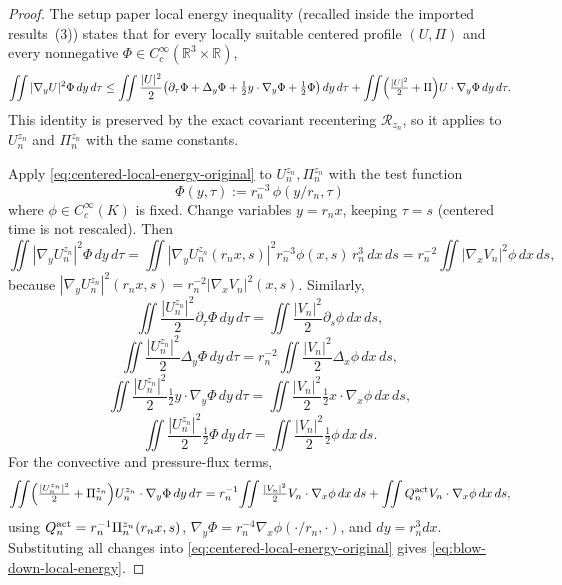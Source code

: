 \documentclass[11pt]{amsart}
\numberwithin{equation}{section}
\theoremstyle{plain}
\theoremstyle{definition}
\theoremstyle{remark}
\newcommand{\calR}{\mathcal R}
\begin{document}
\begin{proof}
The setup paper local energy inequality (recalled inside the imported results
\,(3)) states that for every locally suitable
centered profile \((U,\Pi)\) and every nonnegative
\(\Phi\in C_c^\infty(\mathbb R^3\times\mathbb R)\),
\begin{equation}\label{eq:centered-local-energy-original}
   \iint |\nabla_y U|^2\Phi\,dy\,d\tau
   \le
   \iint \frac{|U|^2}{2}\bigl(\partial_\tau\Phi+\Delta_y\Phi
      +\tfrac12 y\cdot\nabla_y\Phi+\tfrac12\Phi\bigr)\,dy\,d\tau
   +\iint
   \Bigl(\tfrac{|U|^2}{2}+\Pi\Bigr)U\cdot\nabla_y\Phi\,dy\,d\tau .
\end{equation}
This identity is preserved by the exact covariant recentering
\(\calR_{z_n}\), so it applies to \(U_n^{z_n}\) and \(\Pi_n^{z_n}\) with the
same constants.

Apply \eqref{eq:centered-local-energy-original} to \(U_n^{z_n},\Pi_n^{z_n}\)
with the test function
\[
   \Phi(y,\tau):=r_n^{-3}\,\phi(y/r_n,\tau)
\]
where \(\phi\in C_c^\infty(K)\) is fixed.  Change variables
\(y=r_nx\), keeping \(\tau=s\) (centered time is not rescaled).  Then
\[
   \iint|\nabla_yU_n^{z_n}|^2\Phi\,dy\,d\tau
   =\iint |\nabla_yU_n^{z_n}(r_nx,s)|^2 r_n^{-3}\phi(x,s)\,r_n^3\,dx\,ds
   =r_n^{-2}\iint|\nabla_xV_n|^2\phi\,dx\,ds ,
\]
because \(|\nabla_yU_n^{z_n}|^2(r_nx,s)=r_n^{-2}|\nabla_xV_n|^2(x,s)\).
Similarly,
\[
   \iint\frac{|U_n^{z_n}|^2}{2}\partial_\tau\Phi\,dy\,d\tau
   =\iint\frac{|V_n|^2}{2}\partial_s\phi\,dx\,ds ,
\]
\[
   \iint\frac{|U_n^{z_n}|^2}{2}\Delta_y\Phi\,dy\,d\tau
   =r_n^{-2}\iint\frac{|V_n|^2}{2}\Delta_x\phi\,dx\,ds ,
\]
\[
   \iint\frac{|U_n^{z_n}|^2}{2}\tfrac12 y\cdot\nabla_y\Phi\,dy\,d\tau
   =\iint\frac{|V_n|^2}{2}\tfrac12 x\cdot\nabla_x\phi\,dx\,ds ,
\]
\[
   \iint\frac{|U_n^{z_n}|^2}{2}\tfrac12\Phi\,dy\,d\tau
   =\iint\frac{|V_n|^2}{2}\tfrac12\phi\,dx\,ds .
\]
For the convective and pressure-flux terms,
\[
   \iint
   \Bigl(\tfrac{|U_n^{z_n}|^2}{2}+\Pi_n^{z_n}\Bigr)
   U_n^{z_n}\cdot\nabla_y\Phi\,dy\,d\tau
   =
   r_n^{-1}\!\iint
   \tfrac{|V_n|^2}{2}V_n\cdot\nabla_x\phi\,dx\,ds
   +\iint Q_n^{\rm act}V_n\cdot\nabla_x\phi\,dx\,ds ,
\]
using \(Q_n^{\rm act}=r_n^{-1}\Pi_n^{z_n}(r_nx,s)\),
\(\nabla_y\Phi=r_n^{-4}\nabla_x\phi(\cdot/r_n,\cdot)\), and
\(dy=r_n^3dx\).  Substituting
all changes into \eqref{eq:centered-local-energy-original} gives
\eqref{eq:blow-down-local-energy}.


\end{proof}
\end{document}
